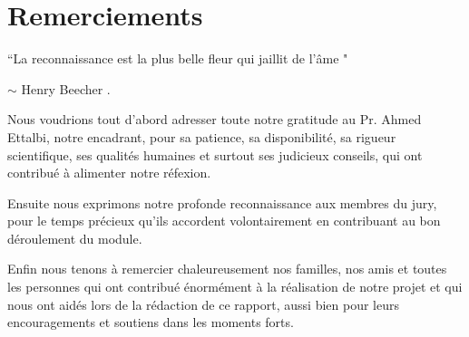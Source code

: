 
\chapter*{Remerciements}



\begin{center}
``La reconnaissance est la plus belle fleur qui jaillit de l'âme "
\end{center}
\begin{center} $\sim$ Henry Beecher . \end{center}
Nous voudrions tout d'abord adresser toute notre gratitude au 
Pr. Ahmed Ettalbi, notre encadrant, pour sa patience, sa disponibilité, sa rigueur scientifique, ses qualités humaines
et surtout ses judicieux conseils, qui ont contribué à alimenter notre
réfexion.

Ensuite nous exprimons notre profonde reconnaissance aux membres
du jury, pour le temps précieux qu'ils accordent volontairement en contribuant au bon déroulement du module.

Enfin nous tenons à remercier chaleureusement nos familles, nos amis et toutes les personnes qui ont contribué énormément à la réalisation de notre projet et qui nous ont aidés lors de la rédaction de ce rapport, aussi bien pour leurs encouragements et soutiens dans les moments forts.

